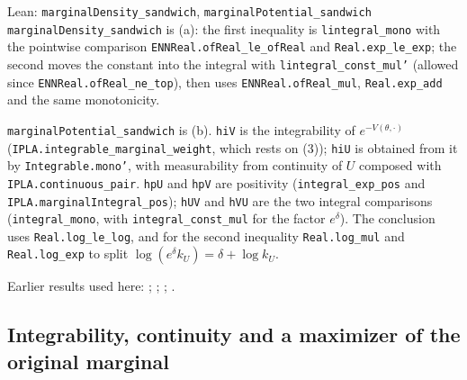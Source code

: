 \documentclass[11pt,a4paper]{report}
\begin{document}
\begin{leanbox}{Lean: \texttt{marginalDensity\_\allowbreak{}sandwich}, \texttt{marginalPotential\_\allowbreak{}sandwich}}
\texttt{marginal\allowbreak{}Density\_\allowbreak{}sandwich} is (a): the first inequality is \texttt{lintegral\_\allowbreak{}mono} with the pointwise comparison \texttt{ENNReal.\allowbreak{}of\allowbreak{}Real\_\allowbreak{}le\_\allowbreak{}of\allowbreak{}Real} and \texttt{Real.\allowbreak{}exp\_\allowbreak{}le\_\allowbreak{}exp}; the second moves the constant into the integral with \texttt{lintegral\_\allowbreak{}const\_\allowbreak{}mul'} (allowed since \texttt{ENNReal.\allowbreak{}of\allowbreak{}Real\_\allowbreak{}ne\_\allowbreak{}top}), then uses \texttt{ENNReal.\allowbreak{}of\allowbreak{}Real\_\allowbreak{}mul}, \texttt{Real.\allowbreak{}exp\_\allowbreak{}add} and the same monotonicity.




\texttt{marginal\allowbreak{}Potential\_\allowbreak{}sandwich} is (b). \texttt{hi\allowbreak{}V} is the integrability of \(e^{-V(\theta,\cdot)}\) (\texttt{IPLA.\allowbreak{}integrable\_\allowbreak{}marginal\_\allowbreak{}weight}, which rests on (3)); \texttt{hi\allowbreak{}U} is obtained from it by \texttt{Integrable.\allowbreak{}mono'}, with measurability from continuity of \(U\) composed with \texttt{IPLA.\allowbreak{}continuous\_\allowbreak{}pair}. \texttt{hp\allowbreak{}U} and \texttt{hp\allowbreak{}V} are positivity (\texttt{integral\_\allowbreak{}exp\_\allowbreak{}pos} and \texttt{IPLA.\allowbreak{}marginal\allowbreak{}Integral\_\allowbreak{}pos}); \texttt{h\allowbreak{}UV} and \texttt{h\allowbreak{}VU} are the two integral comparisons (\texttt{integral\_\allowbreak{}mono}, with \texttt{integral\_\allowbreak{}const\_\allowbreak{}mul} for the factor \(e^\delta\)). The conclusion uses \texttt{Real.\allowbreak{}log\_\allowbreak{}le\_\allowbreak{}log}, and for the second inequality \texttt{Real.\allowbreak{}log\_\allowbreak{}mul} and \texttt{Real.\allowbreak{}log\_\allowbreak{}exp} to split \(\log(e^\delta k_U)=\delta+\log k_U\).
\end{leanbox}


Earlier results used here: \cite[Section~3.1.1]{LangevinLean2026IPLA}; \cite[Section~3.12.1]{LangevinLean2026IPLA}; \cite[Section~3.3.1]{LangevinLean2026IPLA}; \cite[Section~3.9.2]{LangevinLean2026IPLA}.
\subsection{\texorpdfstring{Integrability, continuity and a maximizer of the original marginal}{Integrability, continuity and a maximizer of the original marginal}}
\label{report-step-ProximalLangevin-Perturbation-lean-3}
\end{document}
